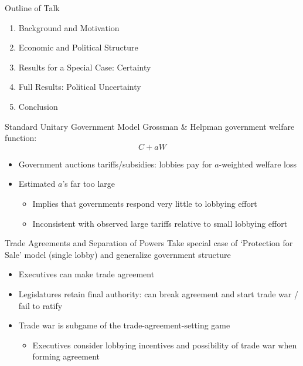 \documentclass[handout]{beamer}
\begin{document}
\begin{frame}{Outline of Talk}
\begin{enumerate}[<+->]
	\item Background and Motivation
	\item Economic and Political Structure
	\item Results for a Special Case: Certainty
	\item Full Results: Political Uncertainty
	\item Conclusion
\end{enumerate}
\end{frame}

 
\begin{frame}{Standard Unitary Government Model}
Grossman $\&$ Helpman government welfare function:
				\[
				  C + aW
				\]
\pause
		\begin{itemize}[<+->]
			\item Government auctions tariffs/subsidies: lobbies pay for $a$-weighted welfare loss
			\item Estimated $a$'s far too large
				\begin{itemize}
					\item Implies that governments respond very little to lobbying effort
					\item Inconsistent with observed large tariffs relative to small lobbying effort
				\end{itemize}
		\end{itemize}
\end{frame} 





\begin{frame}{Trade Agreements and Separation of Powers}
  \pause
  Take special case of `Protection for Sale' model (single lobby) and generalize government structure
  \pause
		\begin{itemize}[<+->]
			\item Executives can make trade agreement
			\item Legislatures retain final authority: can break agreement and start trade war / fail to ratify
			\item Trade war is subgame of the trade-agreement-setting game
				\begin{itemize}
  				\item Executives consider lobbying incentives and possibility of trade war when forming agreement
				\end{itemize}
		\end{itemize}
\end{frame}
\end{document}
